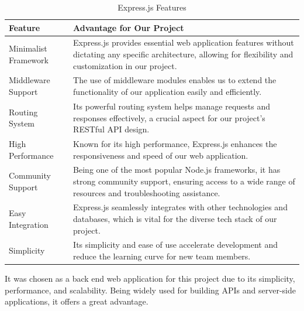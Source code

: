 \begin{table}[H]
    \centering
    \begin{tabularx}{\textwidth}{|l|X|}
        \hline
        \textbf{Feature}     & \textbf{Advantage for Our Project}                                                                                                                              \\
        \hline
        Minimalist Framework & Express.js provides essential web application features without dictating any specific architecture, allowing for flexibility and customization in our project.  \\
        \hline
        Middleware Support   & The use of middleware modules enables us to extend the functionality of our application easily and efficiently.                                                 \\
        \hline
        Routing System       & Its powerful routing system helps manage requests and responses effectively, a crucial aspect for our project's RESTful API design.                             \\
        \hline
        High Performance     & Known for its high performance, Express.js enhances the responsiveness and speed of our web application.                                                        \\
        \hline
        Community Support    & Being one of the most popular Node.js frameworks, it has strong community support, ensuring access to a wide range of resources and troubleshooting assistance. \\
        \hline
        Easy Integration     & Express.js seamlessly integrates with other technologies and databases, which is vital for the diverse tech stack of our project.                               \\
        \hline
        Simplicity           & Its simplicity and ease of use accelerate development and reduce the learning curve for new team members.                                                       \\
        \hline
    \end{tabularx}
    \label{tab:expressJS}
    \caption{Express.js Features}
\end{table}

It was chosen as a back end web application for this project due to its simplicity, performance, and scalability. Being widely used for building APIs and server-side applications, it offers a great
advantage.


